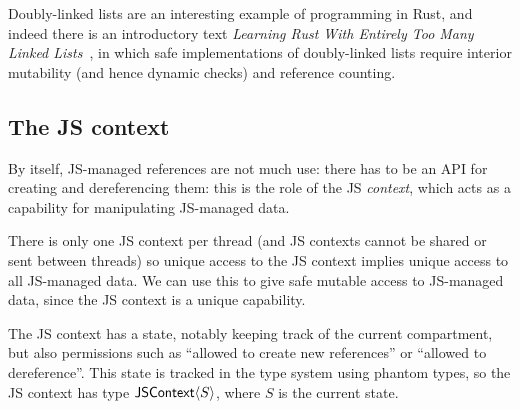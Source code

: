 Doubly-linked lists are an interesting example of programming in Rust,
and indeed there is an introductory text \emph{Learning Rust With
  Entirely Too Many Linked Lists}~\cite{too-many-lists}, in which safe
implementations of doubly-linked lists require interior mutability
(and hence dynamic checks) and reference counting.

\subsection{The JS context}

By itself, JS-managed references are not much use: there has to be an
API for creating and dereferencing them: this is the role of the
JS \emph{context}, which acts as a capability for manipulating
JS-managed data.

There is only one JS context per thread (and JS contexts cannot be shared
or sent between threads) so unique access to the JS context implies unique
access to all JS-managed data. We can use this to give safe mutable access
to JS-managed data, since the JS context is a unique capability.

The JS context has a state, notably keeping track of the current
compartment, but also permissions such as ``allowed to create new
references'' or ``allowed to dereference''.  This state is tracked in
the type system using phantom types, so the JS context
has type $\mathsf{JSContext}\langle S\rangle$, where $S$ is the current state.

